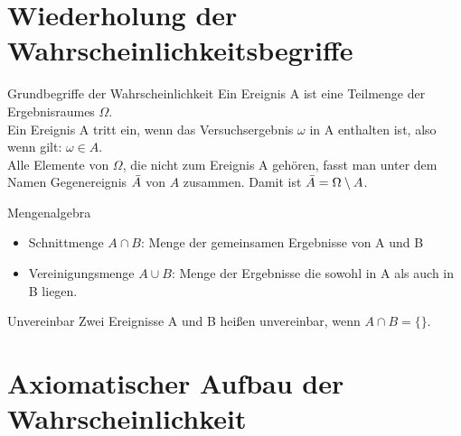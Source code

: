 \section{Wiederholung der Wahrscheinlichkeitsbegriffe}
\begin{merke}{Grundbegriffe der Wahrscheinlichkeit}{}
    Ein Ereignis A ist eine Teilmenge der Ergebnisraumes $\Omega$.\\
    Ein Ereignis A tritt ein, wenn das Versuchsergebnis $\omega$ in A enthalten ist, also wenn gilt: $\omega \in A$.\\
    Alle Elemente von $\Omega$, die nicht zum Ereignis A gehören, fasst man unter dem Namen Gegenereignis $\Bar{A}$ von $A$ zusammen. Damit ist $\Bar{A} = \Omega \setminus A$.
\end{merke}
\begin{b8d}{Mengenalgebra}{}
    \begin{itemize}
        \item Schnittmenge $A\cap B$: Menge der gemeinsamen Ergebnisse von A und B
        \item Vereinigungsmenge $A\cup B$: Menge der Ergebnisse die sowohl in A als auch in B liegen.
    \end{itemize}
\end{b8d}
\begin{merke}{Unvereinbar}{}
Zwei Ereignisse A und B heißen unvereinbar, wenn $A\cap B = \{ \}$.
\end{merke}
\section{Axiomatischer Aufbau der Wahrscheinlichkeit}

